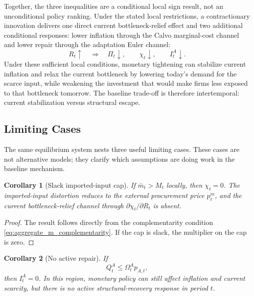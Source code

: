 ﻿\documentclass[12pt]{article}
\newtheorem{corollary}{Corollary}
\theoremstyle{remark}
\begin{document}
Together, the three inequalities are a conditional local sign result, not an unconditional policy
ranking. Under the stated local restrictions, a contractionary innovation delivers one direct
current bottleneck-relief effect and two additional conditional responses: lower inflation through
the Calvo marginal-cost channel and lower repair through the adaptation Euler channel:
\begin{equation}
    R_t\uparrow
    \quad\Rightarrow\quad
    \Pi_t\downarrow,\qquad
    \chi_t\downarrow,\qquad
    I_t^A\downarrow.
    \label{eq:three_channels_summary}
\end{equation}
Under these sufficient local conditions, monetary tightening can stabilize current inflation and
relax the current bottleneck by lowering today's demand for the scarce input, while weakening the
investment that would make firms less exposed to that bottleneck tomorrow. The baseline trade-off
is therefore intertemporal: current stabilization versus structural escape.

\subsection{Limiting Cases}

The same equilibrium system nests three useful limiting cases. These cases are not alternative
models; they clarify which assumptions are doing work in the baseline mechanism.

\begin{corollary}[Slack imported-input cap]\label{cor:slack_cap}
If $\bar m_t>M_t$ locally, then $\chi_t=0$. The imported-input distortion reduces to the external
procurement price $p_t^m$, and the current bottleneck-relief channel through
$\partial\chi_t/\partial R_t$ is absent.
\end{corollary}

\begin{proof}
The result follows directly from the complementarity condition
\eqref{eq:aggregate_m_complementarity}. If the cap is slack, the multiplier on the cap is zero.
\end{proof}

\begin{corollary}[No active repair]\label{cor:no_repair}
If
\begin{equation}
    Q_t^A\le \Omega_t^Ap_{A,t},
    \label{eq:no_repair_condition}
\end{equation}
then $I_t^A=0$. In this region, monetary policy can still affect inflation and current scarcity,
but there is no active structural-recovery response in period $t$.
\end{corollary}
\end{document}
